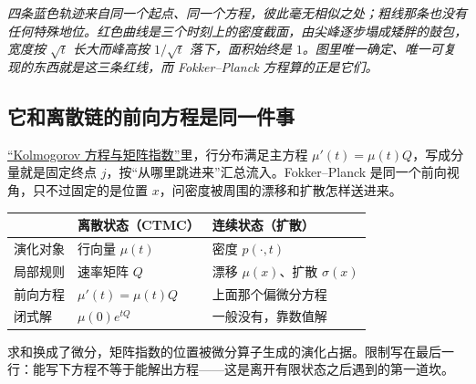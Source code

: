 \begin{center}

\emph{四条蓝色轨迹来自同一个起点、同一个方程，彼此毫无相似之处；粗线那条也没有任何特殊地位。红色曲线是三个时刻上的密度截面，由尖峰逐步塌成矮胖的鼓包，宽度按 \(\sqrt{t}\) 长大而峰高按 \(1/\sqrt t\) 落下，面积始终是 \(1\)。图里唯一确定、唯一可复现的东西就是这三条红线，而 Fokker--Planck 方程算的正是它们。}
\end{center}

\subsection{它和离散链的前向方程是同一件事}

\hyperref[sec:06-Random-Processes/05-Continuous-Time-Markov-Chains-and-Queues/02]{``Kolmogorov 方程与矩阵指数''}里，行分布满足主方程 \(\mu'(t)=\mu(t)Q\)，写成分量就是固定终点 \(j\)，按``从哪里跳进来''汇总流入。Fokker--Planck 是同一个前向视角，只不过固定的是位置 \(x\)，问密度被周围的漂移和扩散怎样送进来。

{\def\LTcaptype{none}
\begin{longtable}{@{}lll@{}}
\toprule\noalign{}
 & 离散状态（CTMC） & 连续状态（扩散） \\
\midrule\noalign{}
\endhead
\bottomrule\noalign{}
\endlastfoot
演化对象 & 行向量 \(\mu(t)\) & 密度 \(p(\cdot,t)\) \\
局部规则 & 速率矩阵 \(Q\) & 漂移 \(\mu(x)\)、扩散 \(\sigma(x)\) \\
前向方程 & \(\mu'(t)=\mu(t)Q\) & 上面那个偏微分方程 \\
闭式解 & \(\mu(0)e^{tQ}\) & 一般没有，靠数值解 \\
\end{longtable}
}

求和换成了微分，矩阵指数的位置被微分算子生成的演化占据。限制写在最后一行：能写下方程不等于能解出方程——这是离开有限状态之后遇到的第一道坎。


